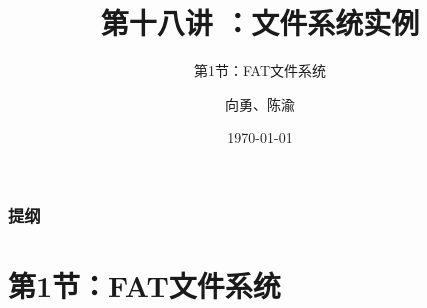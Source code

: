 


\title[第16讲]{第十八讲 ：文件系统实例} %
\subtitle{第1节：FAT文件系统}
\author{向勇、陈渝} %
\date{\today} %



\begin{frame}
\titlepage %
\end{frame}

\begin{frame}
\frametitle{提纲} %
\tableofcontents %

\end{frame}
\section{第1节：FAT文件系统} %
